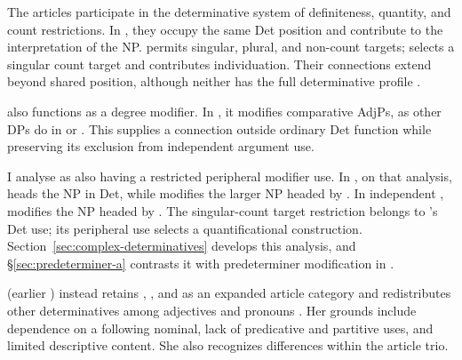 \documentclass[12pt]{article}
\begin{document}
The articles participate in the determinative system of definiteness, quantity, and count restrictions. In , they occupy the same Det position and contribute to the interpretation of the NP.  permits singular, plural, and non-count targets;  selects a singular count target and contributes individuation. Their connections extend beyond shared position, although neither has the full determinative profile \citep[368--373]{huddleston2002}.

 also functions as a degree modifier. In , it modifies comparative AdjPs, as other DPs do in  or  \citep[1131--1132, 1135--1136]{huddleston2002}. This supplies a connection outside ordinary Det function while preserving its exclusion from independent argument use.

I analyse  as also having a restricted peripheral modifier use. In , on that analysis,  heads the NP in Det, while  modifies the larger NP headed by . In independent ,  modifies the NP headed by . The singular-count target restriction belongs to 's Det use; its peripheral use selects a quantificational construction. Section~\ref{sec:complex-determinatives} develops this analysis, and §\ref{sec:predeterminer-a} contrasts it with predeterminer modification in .

\textcite[153--158]{spinillo2004reconceptualising} (earlier \citealp{spinillo2000determiners}) instead retains , , and  as an expanded article category and redistributes other determinatives among adjectives and pronouns \citep[194--195]{spinillo2004reconceptualising}. Her grounds include dependence on a following nominal, lack of predicative and partitive uses, and limited descriptive content. She also recognizes differences within the article trio.
\end{document}
